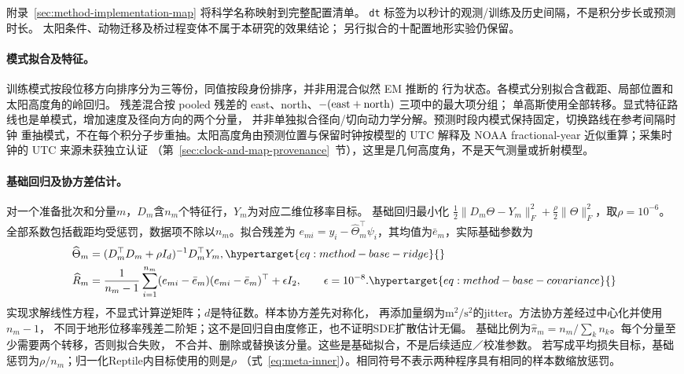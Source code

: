 \noindent 附录~\ref{sec:method-implementation-map} 将科学名称映射到完整配置清单。
\texttt{dt} 标签为以秒计的观测/训练及历史间隔，不是积分步长或预测时长。
太阳条件、动物迁移及桥过程变体不属于本研究的效果结论；
另行拟合的十配置地形实验仍保留。

\paragraph{模式拟合及特征。}
训练模式按段位移方向排序分为三等份，同值按段身份排序，并非用混合似然 EM 推断的
行为状态。各模式分别拟合含截距、局部位置和太阳高度角的岭回归。
残差混合按 pooled 残差的 east、north、\(-({\rm east}+{\rm north})\) 三项中的最大项分组；
单高斯使用全部转移。显式特征路线也是单模式，增加速度及径向方向的两个分量，
并非单独拟合径向/切向动力学分解。预测时段内模式保持固定，切换路线在参考间隔时钟
重抽模式，不在每个积分子步重抽。太阳高度角由预测位置与保留时钟按模型的 UTC 解释及 NOAA
fractional-year 近似重算\cite{noaa}；采集时钟的 UTC 来源未获独立认证
（第~\ref{sec:clock-and-map-provenance}~节），这里是几何高度角，不是天气测量或折射模型。

\paragraph{基础回归及协方差估计。}
\label{sec:method-base-fit}\hypertarget{sec:method-base-fit}{}
对一个准备批次和分量\(m\)，\(D_m\)含\(n_m\)个特征行，\(Y_m\)为对应二维位移率目标。
基础回归最小化
\(\tfrac12\|D_m\Theta-Y_m\|_F^2+\tfrac\rho2\|\Theta\|_F^2\)，取\(\rho=10^{-6}\)。
全部系数包括截距均受惩罚，数据项不除以\(n_m\)。拟合残差为
\(e_{mi}=y_i-\widehat\Theta_m^\top\psi_i\)，其均值为\(\bar e_m\)，实际基础参数为
\begin{align}
 \widehat\Theta_m&=(D_m^\top D_m+\rho I_d)^{-1}D_m^\top Y_m,
 \label{eq:method-base-ridge}\hypertarget{eq:method-base-ridge}{}\\
 \widehat R_m&=\frac1{n_m-1}\sum_{i=1}^{n_m}
 (e_{mi}-\bar e_m)(e_{mi}-\bar e_m)^\top+\epsilon I_2,
 \qquad \epsilon=10^{-8}.
 \label{eq:method-base-covariance}\hypertarget{eq:method-base-covariance}{}
\end{align}
实现求解线性方程，不显式计算逆矩阵；\(d\)是特征数。样本协方差先对称化，
再添加量纲为\(\mathrm{m}^2/\mathrm{s}^2\)的jitter。方法协方差经过中心化并使用\(n_m-1\)，
不同于地形位移率残差二阶矩；这不是回归自由度修正，也不证明SDE扩散估计无偏。
基础比例为\(\widehat\pi_m=n_m/\sum_k n_k\)。每个分量至少需要两个转移，否则拟合失败，
不合并、删除或替换该分量。这些是基础拟合，不是后续适应／校准参数。
若写成平均损失目标，基础惩罚为\(\rho/n_m\)；归一化Reptile内目标使用的则是\(\rho\)
（式~\eqref{eq:meta-inner}）。相同符号不表示两种程序具有相同的样本数缩放惩罚。

